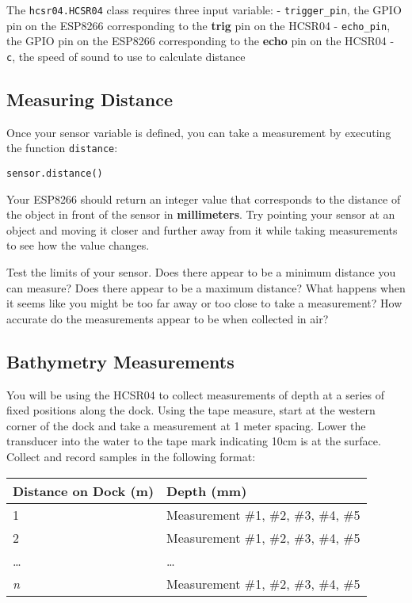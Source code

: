 \documentclass[11pt]{article}
\begin{document}
The \texttt{hcsr04.HCSR04} class requires three input variable: -
\texttt{trigger\_pin}, the GPIO pin on the ESP8266 corresponding to the
\textbf{trig} pin on the HCSR04 - \texttt{echo\_pin}, the GPIO pin on
the ESP8266 corresponding to the \textbf{echo} pin on the HCSR04 -
\texttt{c}, the speed of sound to use to calculate distance

\hypertarget{measuring-distance}{%
\subsection{Measuring Distance}\label{measuring-distance}}

Once your sensor variable is defined, you can take a measurement by
executing the function \texttt{distance}:

\texttt{sensor.distance()}

Your ESP8266 should return an integer value that corresponds to the
distance of the object in front of the sensor in \textbf{millimeters}.
Try pointing your sensor at an object and moving it closer and further
away from it while taking measurements to see how the value changes.

Test the limits of your sensor. Does there appear to be a minimum
distance you can measure? Does there appear to be a maximum distance?
What happens when it seems like you might be too far away or too close
to take a measurement? How accurate do the measurements appear to be
when collected in air?

\hypertarget{bathymetry-measurements}{%
\subsection{Bathymetry Measurements}\label{bathymetry-measurements}}

You will be using the HCSR04 to collect measurements of depth at a
series of fixed positions along the dock. Using the tape measure, start
at the western corner of the dock and take a measurement at 1 meter
spacing. Lower the transducer into the water to the tape mark indicating
10cm is at the surface. Collect and record samples in the following
format:

\begin{longtable}[]{@{}ll@{}}
\toprule
Distance on Dock (m) & Depth (mm)\tabularnewline
\midrule
\endhead
1 & Measurement \#1, \#2, \#3, \#4, \#5\tabularnewline
2 & Measurement \#1, \#2, \#3, \#4, \#5\tabularnewline
\ldots{} & \ldots{}\tabularnewline
\emph{n} & Measurement \#1, \#2, \#3, \#4, \#5\tabularnewline
\bottomrule
\end{longtable}
\end{document}
